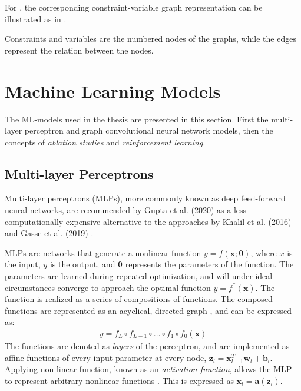 For , the corresponding constraint-variable graph representation can be illustrated as in
.

Constraints and variables are the numbered nodes of the graphs, while the edges represent the relation between the nodes. 



\section{Machine Learning Models}\label{sec:back_models}


The \gls{ML}-models used in the thesis are presented in this section. First the multi-layer perceptron and graph convolutional neural network models, then the concepts of \textit{ablation studies} and \textit{reinforcement learning}.

\subsection{Multi-layer Perceptrons}\label{ssec:back_mlp}

Multi-layer perceptrons (\gls{MLP}s), more commonly known as deep feed-forward neural networks, are recommended by Gupta et al. (2020) \cite{gupta2020hybrid} as a less computationally expensive alternative to the approaches by Khalil et al. (2016) \cite{khalil2016learning} and Gasse et al. (2019) \cite{gasse2019exact}. 

\gls{MLP}s are networks that generate a nonlinear function $y = f(\mathbf{x}; \bm{\theta})$, where $x$ is the input, $y$ is the output, and $\bm{\theta}$ represents the parameters of the function. The parameters are learned during repeated optimization, and will under ideal circumstances converge to approach the optimal function $y = f^*(\mathbf{x})$. The function is realized as a series of compositions of functions. The composed functions are represented as an acyclical, directed graph \cite{nielsen2018neural}, and can be expressed as:
\begin{align}
    y = f_L \circ f_{L-1} \circ \ldots \circ f_{1} \circ f_{0} (\mathbf{x})  
\end{align}
The functions are denoted as \textit{layers} of the perceptron, and are implemented as affine functions of every input parameter at every node, $\mathbf{z}_l = \mathbf{x}_{l-1}^T \mathbf{w}_l + \mathbf{b}_l$. Applying non-linear function, known as an \textit{activation function}, allows the \gls{MLP} to represent arbitrary nonlinear functions \cite{goodfellow2016deep}. This is expressed as $\mathbf{x}_l = \mathbf{a}(\mathbf{z}_l)$.

